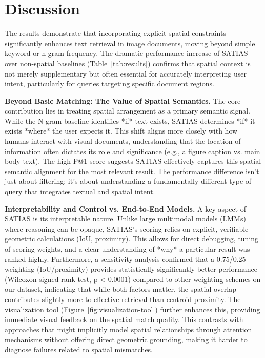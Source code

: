 \documentclass[manuscript,screen]{acmart}
\begin{document}
\section{Discussion}
\label{sec:discussion}

The results demonstrate that incorporating explicit spatial constraints significantly enhances text retrieval in image documents, moving beyond simple keyword or n-gram frequency. The dramatic performance increase of SATIAS over non-spatial baselines (Table~\ref{tab:results}) confirms that spatial context is not merely supplementary but often essential for accurately interpreting user intent, particularly for queries targeting specific document regions.

\textbf{Beyond Basic Matching: The Value of Spatial Semantics.} The core contribution lies in treating spatial arrangement as a primary semantic signal. While the N-gram baseline identifies *if* text exists, SATIAS determines *if* it exists *where* the user expects it. This shift aligns more closely with how humans interact with visual documents, understanding that the location of information often dictates its role and significance (e.g., a figure caption vs. main body text). The high P@1 score suggests SATIAS effectively captures this spatial semantic alignment for the most relevant result. The performance difference isn't just about filtering; it's about understanding a fundamentally different type of query that integrates textual and spatial intent.

\textbf{Interpretability and Control vs. End-to-End Models.} A key aspect of SATIAS is its interpretable nature. Unlike large multimodal models (LMMs) \cite{Huang24, Yin24} where reasoning can be opaque, SATIAS's scoring relies on explicit, verifiable geometric calculations (IoU, proximity). This allows for direct debugging, tuning of scoring weights, and a clear understanding of *why* a particular result was ranked highly. Furthermore, a sensitivity analysis confirmed that a 0.75/0.25 weighting (IoU/proximity) provides statistically significantly better performance (Wilcoxon signed-rank test, p < 0.0001) compared to other weighting schemes on our dataset, indicating that while both factors matter, the spatial overlap contributes slightly more to effective retrieval than centroid proximity. The visualization tool (Figure~\ref{fig:visualization-tool}) further enhances this, providing immediate visual feedback on the spatial match quality. This contrasts with approaches that might implicitly model spatial relationships through attention mechanisms without offering direct geometric grounding, making it harder to diagnose failures related to spatial mismatches.
\end{document}
